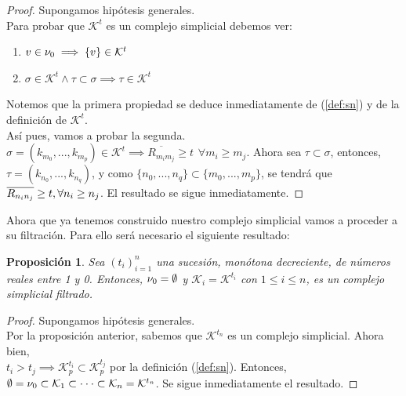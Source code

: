\documentclass[12pt]{article}
\numberwithin{equation}{section}
\theoremstyle{definition}
\theoremstyle{remark}
\theoremstyle{plain}
\newtheorem{prop}{Proposición}
\begin{document}
		\newpage

		\begin{proof}
			Supongamos hipótesis generales. \\
			Para probar que $\mathcal{K}^{t}$ es un complejo simplicial debemos ver: 
			\begin{enumerate}
				\item $v \in {\Large \nu}_{0} \implies \{v\} \in \mathcal{K}^{t}$
				\item $ \sigma \in \mathcal{K}^{t} \land \tau \subset \sigma \implies \tau \in \mathcal{K}^{t}$	
			\end{enumerate}
			Notemos que la primera propiedad se deduce inmediatamente de (\ref{def:sn}) y de la definición 
			de $\mathcal{K}^{t}$. \\
			Así pues, vamos a probar la segunda.\\
			$\sigma=(k_{m_{0}},...,k_{m_{p}}) \in \mathcal{K}^{t} \implies \overline{R_{m_{i}m_{j}}}\geq t \hspace{5pt} 
			\forall m_{i} \geq m_{j}$. Ahora sea $\tau \subset \sigma$, entonces, \\
			$\tau = (k_{n_{0}},...,k_{n_{q}})$, y como $\{n_{0},...,n_{q}\} \subset \{m_{0},...,m_{p}\}$, se tendrá que $\overline{R_{n_{i}n_{j}}} \geq t, \\
			\forall n_{i} \geq n_{j}$. El resultado se sigue inmediatamente. 
		\end{proof}

		Ahora que ya tenemos construido nuestro complejo simplicial vamos a proceder a su filtración. Para ello será necesario
		el siguiente resultado:

		\begin{prop}
			Sea $(t_{i})_{i=1}^{n}$ una sucesión, monótona decreciente, de números reales entre 1 y 0. Entonces, 
			${\Large \nu}_{0}=\emptyset$ y $\mathcal{K}_{i}=\mathcal{K}^{t_{i}}$ con $1\leq i \leq n$, es un complejo simplicial filtrado.   
		\end{prop}

		\begin{proof}
			Supongamos hipótesis generales.\\
			Por la proposición anterior, sabemos que $\mathcal{K}^{t_{n}}$ es un complejo simplicial. Ahora bien, \\
			$t_{i} > t_{j} \implies \mathcal{K}_{p}^{t_{i}} \subset \mathcal{K}_{p}^{t_{j}}$ por la definición (\ref{def:sn}). Entonces, 
			$\emptyset={\Large \nu}_{0} \subset \mathcal{K}_{1} \subset \cdot \cdot \cdot \subset \mathcal{K}_{n}=\mathcal{K}^{t_{n}}$. Se sigue
			inmediatamente el resultado.
		\end{proof}
\end{document}

